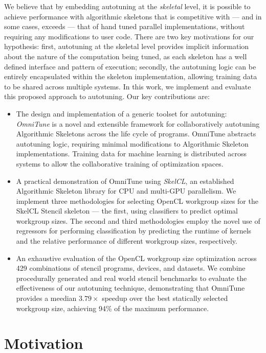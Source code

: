   We believe that by embedding autotuning at the \textit{skeletal} level, it is possible to achieve performance with algorithmic skeletons that is competitive with --- and in some cases, exceeds --- that of hand tuned parallel implementations, without requiring any modifications to user code. There are two key motivations for our hypothesis: first, autotuning at the skeletal level provides implicit information about the nature of the computation being tuned, as each skeleton has a well defined interface and pattern of execution; secondly, the autotuning logic can be entirely encapsulated within the skeleton implementation, allowing training data to be shared across multiple systems. In this work, we implement and evaluate this proposed approach to autotuning. Our key contributions are:
  \begin{itemize}
    \item The design and implementation of a generic toolset for
    autotuning: \emph{OmniTune} is a novel and extensible framework for
    collaboratively autotuning Algorithmic Skeletons across the life
    cycle of programs. OmniTune abstracts autotuning logic, requiring
    minimal modifications to Algorithmic Skeleton
    implementations. Training data for machine learning is distributed
    across systems to allow the collaborative training of optimization
    spaces.
    \item A practical demonstration of OmniTune using \textit{SkelCL}, an
    established Algorithmic Skeleton library for CPU and multi-GPU
    parallelism. We implement three methodologies for selecting OpenCL
    workgroup sizes for the SkelCL Stencil skeleton --- the first, using
    classifiers to predict optimal workgroup sizes. The second and third
    methodologies employ the novel use of regressors for performing
    classification by predicting the runtime of kernels and the relative
    performance of different workgroup sizes, respectively.
    \item An exhaustive evaluation of the OpenCL workgroup size
    optimization across 429 combinations of stencil programs, devices,
    and datasets. We combine procedurally generated and real world
    stencil benchmarks to evaluate the effectiveness of our autotuning
    technique, demonstrating that OmniTune provides a meedian
    $3.79\times$ speedup over the best statically selected workgroup
    size, achieving 94\% of the maximum performance.
  \end{itemize}

  \section{Motivation}

